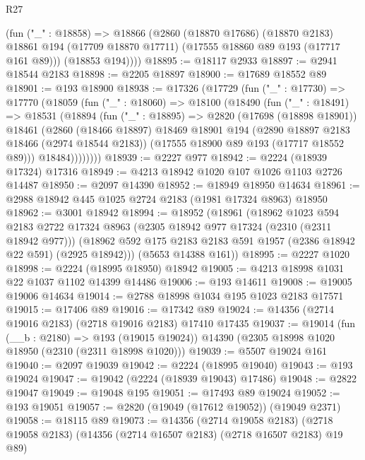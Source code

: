 \begin{lexlean}{R27}
\begin{coremodule}
        (fun ("_" : @18858) =>
        @18866
          (@2860
            (@18870 @17686)
            (@18870 @2183)
            @18861
            @194
            (@17709 @18870 @17711)
            (@17555 @18860 @89 @193 (@17717 @161 @89)))
          (@18853 @194))))
@18895 := @18117 @2933
@18897 := @2941 @18544 @2183
@18898 := @2205 @18897
@18900 := @17689 @18552 @89
@18901 := @193 @18900
@18938 := @17326
    (@17729
      (fun ("_" : @17730) =>
      @17770
        (@18059
          (fun ("_" : @18060) =>
          @18100
            (@18490
              (fun ("_" : @18491) =>
              @18531
                (@18894
                  (fun ("_" : @18895) =>
                  @2820
                    (@17698 (@18898 @18901))
                    @18461
                    (@2860
                      (@18466 @18897)
                      @18469
                      @18901
                      @194
                      (@2890 @18897 @2183 @18466 (@2974 @18544 @2183))
                      (@17555 @18900 @89 @193 (@17717 @18552 @89)))
                    @18484))))))))
@18939 := @2227 @977
@18942 := @2224 (@18939 @17324) @17316
@18949 := @4213 @18942 @1020 @107 @1026 @1103 @2726 @14487
@18950 := @2097 @14390
@18952 := @18949 @18950 @14634
@18961 := @2988 @18942 @445 @1025 @2724 @2183 (@1981 @17324 @8963) @18950
@18962 := @3001 @18942
@18994 := @18952
    (@18961
      (@18962
        @1023
        @594
        @2183
        @2722
        @17324
        @8963
        (@2305 @18942 @977 @17324 (@2310 (@2311 @18942 @977)))
        (@18962 @592 @175 @2183 @2183 @591 @1957 (@2386 @18942 @22 @591) (@2925 @18942)))
      (@5653 @14388 @161))
@18995 := @2227 @1020
@18998 := @2224 (@18995 @18950) @18942
@19005 := @4213 @18998 @1031 @22 @1037 @1102 @14399 @14486
@19006 := @193 @14611
@19008 := @19005 @19006 @14634
@19014 := @2788 @18998 @1034 @195 @1023 @2183 @17571
@19015 := @17406 @89
@19016 := @17342 @89
@19024 := @14356 (@2714 @19016 @2183) (@2718 @19016 @2183) @17410 @17435
@19037 := @19014
    (fun (__b : @2180) => @193 (@19015 @19024))
    @14390
    (@2305 @18998 @1020 @18950 (@2310 (@2311 @18998 @1020)))
@19039 := @5507 @19024 @161
@19040 := @2097 @19039
@19042 := @2224 (@18995 @19040)
@19043 := @193 @19024
@19047 := @19042 (@2224 (@18939 @19043) @17486)
@19048 := @2822 @19047
@19049 := @19048 @195
@19051 := @17493 @89 @19024
@19052 := @193 @19051
@19057 := @2820 (@19049 (@17612 @19052)) (@19049 @2371)
@19058 := @18115 @89
@19073 := @14356
    (@2714 @19058 @2183)
    (@2718 @19058 @2183)
    (@14356 (@2714 @16507 @2183) (@2718 @16507 @2183) @19 @89)

\end{coremodule}
\end{lexlean}
